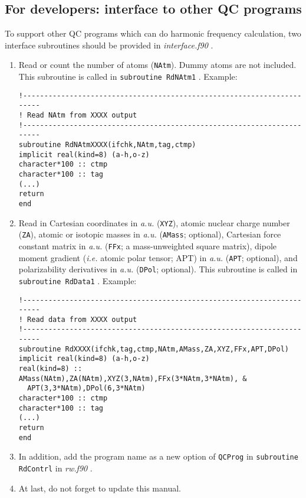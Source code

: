 \documentclass[12pt,english]{extarticle}
\begin{document}
\pagebreak{}

\subsection{For developers: interface to other QC programs} \label{sec:interface}

To support other QC programs which can do harmonic frequency calculation, two interface subroutines should be provided in \emph{interface.f90} .

\begin{enumerate}
\item Read or count the number of atoms (\verb|NAtm|). Dummy atoms are not included. This subroutine is called in \verb|subroutine RdNAtm1| . Example:
\begin{lstlisting}[language={[90]Fortran}]
!-----------------------------------------------------------------------
! Read NAtm from XXXX output
!-----------------------------------------------------------------------
subroutine RdNAtmXXXX(ifchk,NAtm,tag,ctmp)
implicit real(kind=8) (a-h,o-z)
character*100 :: ctmp
character*100 :: tag
(...)
return
end
\end{lstlisting}

\item Read in Cartesian coordinates in \emph{a.u.} (\verb|XYZ|), atomic nuclear charge number (\verb|ZA|), atomic or isotopic masses in \emph{a.u.} (\verb|AMass|; optional), Cartesian force constant matrix in \emph{a.u.}
(\verb|FFx|; a mass-unweighted square matrix), dipole moment gradient (\emph{i.e.} atomic polar tensor; APT) in \emph{a.u.}
(\verb|APT|; optional), and polarizability derivatives in \emph{a.u.}
(\verb|DPol|; optional). This subroutine is called in \verb|subroutine RdData1| . Example:
\begin{lstlisting}[language={[90]Fortran}]
!-----------------------------------------------------------------------
! Read data from XXXX output
!-----------------------------------------------------------------------
subroutine RdXXXX(ifchk,tag,ctmp,NAtm,AMass,ZA,XYZ,FFx,APT,DPol)
implicit real(kind=8) (a-h,o-z)
real(kind=8) :: AMass(NAtm),ZA(NAtm),XYZ(3,NAtm),FFx(3*NAtm,3*NAtm), &
  APT(3,3*NAtm),DPol(6,3*NAtm)
character*100 :: ctmp
character*100 :: tag
(...)
return
end
\end{lstlisting}

\item In addition, add the program name as a new option of \verb|QCProg| in \verb|subroutine RdContrl| in \emph{rw.f90} .

\item At last, do not forget to update this manual.
\end{enumerate}

\pagebreak{}

{}
\printindex
\end{document}
